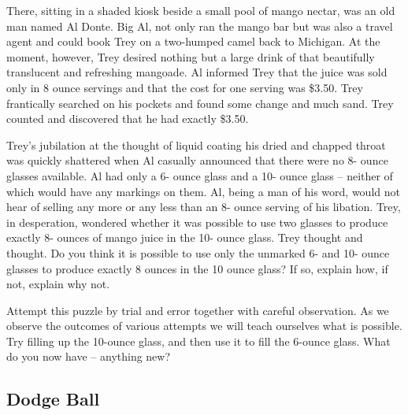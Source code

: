 There, sitting in a shaded kiosk beside a small pool of mango nectar, was an old man named Al Donte. Big Al, not only ran the mango bar but was also a travel agent and could book Trey on a two-humped camel back to Michigan. At the moment, however, Trey desired nothing but a large drink of that beautifully translucent and refreshing mangoade. Al informed Trey that the juice was sold only in 8 ounce servings and that the cost for one serving was \$3.50. Trey frantically searched on his pockets and found some change and much sand. Trey counted and discovered that he had exactly \$3.50.

Trey's jubilation at the thought of liquid coating his dried and chapped throat was quickly shattered when Al casually announced that there were no 8- ounce glasses available. Al had only a 6- ounce glass and a 10- ounce glass -- neither of which would have any markings on them. Al, being a man of his word, would not hear of selling any more or any less than an 8- ounce serving of his libation. Trey, in desperation, wondered whether it was possible to use two glasses to produce exactly 8- ounces of mango juice in the 10- ounce glass. Trey thought and thought. Do you think it is possible to use only the unmarked 6- and 10- ounce glasses to produce exactly 8 ounces in the 10 ounce glass? If so, explain how, if not, explain why not.

\ifnudges
\hrulefill

Attempt this puzzle by trial and error together with careful observation.  As we observe the outcomes of various attempts we will teach ourselves what is possible.  Try filling up the 10-ounce glass, and then use it to fill the 6-ounce glass.  What do you now have -- anything new?
\fi

\clearpage
\subsection{Dodge Ball}

